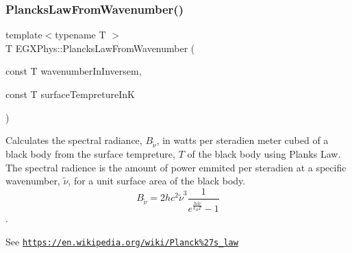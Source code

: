 \subsubsection{\texorpdfstring{Plancks\+Law\+From\+Wavenumber()}{PlancksLawFromWavenumber()}}
{\footnotesize\ttfamily template$<$typename T $>$ \\
T E\+G\+X\+Phys\+::\+Plancks\+Law\+From\+Wavenumber (\begin{DoxyParamCaption}\item[{const T}]{wavenumber\+In\+Inversem,  }\item[{const T}]{surface\+Tempreture\+InK }\end{DoxyParamCaption})}



Calculates the spectral radiance, $B_{\tilde {\nu }}$, in watts per steradien meter cubed of a black body from the surface tempreture, $T$ of the black body using Plank\textquotesingle{}s Law. The spectral radience is the amount of power emmited per steradien at a specific wavenumber, $\tilde {\nu }$, for a unit surface area of the black body. \[ B_{\tilde {\nu }} = 2 h c^2 \tilde {\nu }^3 \dfrac{1}{e^{\frac{hc \tilde {\nu }}{k_B T}} - 1} \]. 

See \href{https://en.wikipedia.org/wiki/Planck%27s_law}{\tt https\+://en.\+wikipedia.\+org/wiki/\+Planck\%27s\+\_\+law}


